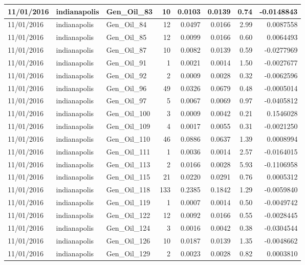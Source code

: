 \documentclass[
  letterpaper,
  DIV=11,
  numbers=noendperiod]{scrartcl}
\begin{document}
\begin{tabular}{l|l|l|r|r|r|r|r}
\hline
11/01/2016 & indianapolis & Gen\_Oil\_83 & 10 & 0.0103 & 0.0139 & 0.74 & -0.0148843\\
\hline
11/01/2016 & indianapolis & Gen\_Oil\_84 & 12 & 0.0497 & 0.0166 & 2.99 & 0.0087558\\
\hline
11/01/2016 & indianapolis & Gen\_Oil\_85 & 12 & 0.0099 & 0.0166 & 0.60 & 0.0064493\\
\hline
11/01/2016 & indianapolis & Gen\_Oil\_87 & 10 & 0.0082 & 0.0139 & 0.59 & -0.0277969\\
\hline
11/01/2016 & indianapolis & Gen\_Oil\_91 & 1 & 0.0021 & 0.0014 & 1.50 & -0.0027677\\
\hline
11/01/2016 & indianapolis & Gen\_Oil\_92 & 2 & 0.0009 & 0.0028 & 0.32 & -0.0062596\\
\hline
11/01/2016 & indianapolis & Gen\_Oil\_96 & 49 & 0.0326 & 0.0679 & 0.48 & -0.0005014\\
\hline
11/01/2016 & indianapolis & Gen\_Oil\_97 & 5 & 0.0067 & 0.0069 & 0.97 & -0.0405812\\
\hline
11/01/2016 & indianapolis & Gen\_Oil\_100 & 3 & 0.0009 & 0.0042 & 0.21 & 0.1546028\\
\hline
11/01/2016 & indianapolis & Gen\_Oil\_109 & 4 & 0.0017 & 0.0055 & 0.31 & -0.0021250\\
\hline
11/01/2016 & indianapolis & Gen\_Oil\_110 & 46 & 0.0886 & 0.0637 & 1.39 & 0.0008994\\
\hline
11/01/2016 & indianapolis & Gen\_Oil\_111 & 1 & 0.0036 & 0.0014 & 2.57 & -0.0164015\\
\hline
11/01/2016 & indianapolis & Gen\_Oil\_113 & 2 & 0.0166 & 0.0028 & 5.93 & -0.1106958\\
\hline
11/01/2016 & indianapolis & Gen\_Oil\_115 & 21 & 0.0220 & 0.0291 & 0.76 & 0.0005312\\
\hline
11/01/2016 & indianapolis & Gen\_Oil\_118 & 133 & 0.2385 & 0.1842 & 1.29 & -0.0059840\\
\hline
11/01/2016 & indianapolis & Gen\_Oil\_119 & 1 & 0.0007 & 0.0014 & 0.50 & -0.0049742\\
\hline
11/01/2016 & indianapolis & Gen\_Oil\_122 & 12 & 0.0092 & 0.0166 & 0.55 & -0.0028445\\
\hline
11/01/2016 & indianapolis & Gen\_Oil\_124 & 3 & 0.0016 & 0.0042 & 0.38 & -0.0304544\\
\hline
11/01/2016 & indianapolis & Gen\_Oil\_126 & 10 & 0.0187 & 0.0139 & 1.35 & -0.0048662\\
\hline
11/01/2016 & indianapolis & Gen\_Oil\_129 & 2 & 0.0023 & 0.0028 & 0.82 & 0.0003810\\

\end{tabular}
\end{document}
